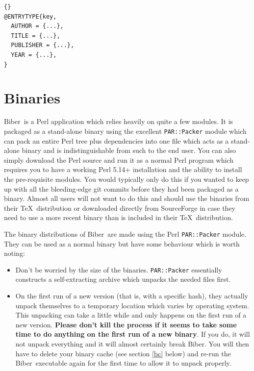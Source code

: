 \documentclass{ltxdockit}
\newcommand*{\biber}{Biber\xspace}
\begin{document}
\begin{lstlisting}[style=bibtex]{}
@ENTRYTYPE{key,
  AUTHOR = {...},
  TITLE = {...},
  PUBLISHER = {...},
  YEAR = {...},
}
\end{lstlisting}
\bigskip
\section{Binaries}\label{binaries}

\biber\ is a Perl application which relies heavily on quite a few
modules. It is packaged as a stand-alone binary using the excellent
\verb+PAR::Packer+ module which can pack an entire Perl tree plus
dependencies into one file which acts as a stand-alone binary and is
indistinguishable from such to the end user. You can also simply download
the Perl source and run it as a normal Perl program which
requires you to have a working Perl 5.14+ installation and the
ability to install the pre-requisite modules. You would typically only do
this if you wanted to keep up with all the bleeding-edge git commits before
they had been packaged as a binary. Almost all users will not want to do
this and should use the binaries from their \TeX\ distribution or downloaded
directly from SourceForge in case they need to use a more recent binary
than is included in their \TeX\ distribution.

The binary distributions of \biber\ are made using the Perl \verb+PAR::Packer+
module. They can be used as a normal binary but have some behaviour which
is worth noting:

\begin{itemize}
\item Don't be worried by the size of the binaries. \verb+PAR::Packer+ essentially
  constructs a self-extracting archive which unpacks the needed files first.
\item On the first run of a new version (that is, with a specific hash),
  they actually unpack themselves to a temporary location which varies by
  operating system. This unpacking can take a little while and only happens
  on the first run of a new version. \textbf{Please don't kill the process
    if it seems to take some time to do anything on the first run of a new
    binary}. If you do, it will not unpack everything and it will almost
  certainly break \biber. You will then have to delete your binary
  cache (see section \ref{bc} below) and re-run the \biber\ executable
  again for the first time to allow it to unpack properly.
\end{itemize}
\end{document}

